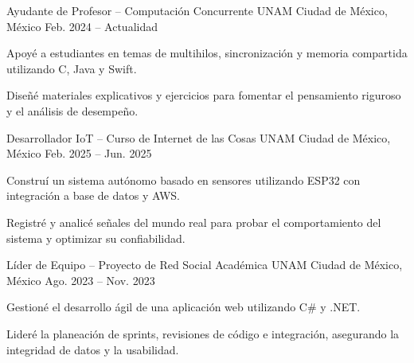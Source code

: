 \begin{cventries}

  \cventry
    {Ayudante de Profesor – Computación Concurrente}
    {UNAM}
    {Ciudad de México, México}
    {Feb. 2024 -- Actualidad}
    {
      \begin{cvitems}
        \item {Apoyé a estudiantes en temas de multihilos, sincronización y memoria compartida utilizando C, Java y Swift.}
        \item {Diseñé materiales explicativos y ejercicios para fomentar el pensamiento riguroso y el análisis de desempeño.}
      \end{cvitems}
    }

  \cventry
    {Desarrollador IoT – Curso de Internet de las Cosas}
    {UNAM}
    {Ciudad de México, México}
    {Feb. 2025 -- Jun. 2025}
    {
      \begin{cvitems}
        \item {Construí un sistema autónomo basado en sensores utilizando ESP32 con integración a base de datos y AWS.}
        \item {Registré y analicé señales del mundo real para probar el comportamiento del sistema y optimizar su confiabilidad.}
      \end{cvitems}
    }

  \cventry
    {Líder de Equipo – Proyecto de Red Social Académica}
    {UNAM}
    {Ciudad de México, México}
    {Ago. 2023 -- Nov. 2023}
    {
      \begin{cvitems}
        \item {Gestioné el desarrollo ágil de una aplicación web utilizando C\# y .NET.}
        \item {Lideré la planeación de sprints, revisiones de código e integración, asegurando la integridad de datos y la usabilidad.}
      \end{cvitems}
    }

\end{cventries}
